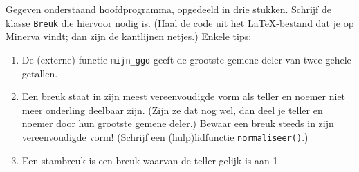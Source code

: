 \beginoef
Gegeven onderstaand hoofdprogramma, opgedeeld in drie stukken. Schrijf de klasse \verb}Breuk} die hiervoor nodig is.
(Haal de code uit het \LaTeX-bestand dat je op Minerva vindt; dan zijn de kantlijnen netjes.)
Enkele tips:
\begin{enumerate}
\item De (externe) functie \verb}mijn_ggd} geeft de grootste gemene deler van twee gehele getallen.
\item Een breuk staat in zijn meest vereenvoudigde vorm als teller en noemer niet meer onderling deelbaar zijn.
(Zijn ze dat nog wel, dan deel je teller en noemer door hun grootste gemene deler.)
Bewaar een breuk steeds in zijn vereenvoudigde vorm! (Schrijf een (hulp)lidfunctie \verb}normaliseer()}.)
\item Een stambreuk is een breuk waarvan de teller gelijk is aan 1.
\end{enumerate}
